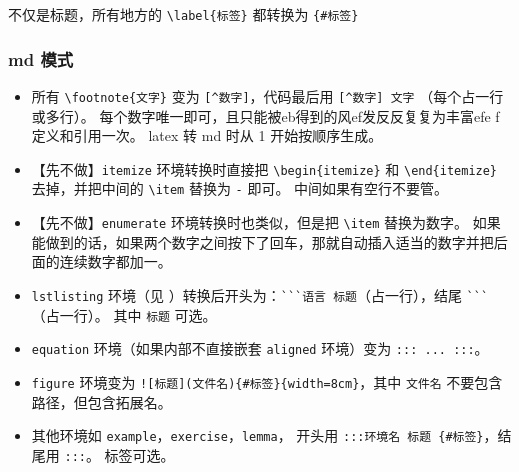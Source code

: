 
不仅是标题，所有地方的 \verb`\label{标签}` 都转换为 \verb`{#标签}`

\subsubsection{md 模式}
\begin{itemize}

\subsubsection{文章信息}

\item 所有 \verb`\footnote{文字}` 变为 \verb`[^数字]`，代码最后用 \verb`[^数字] 文字` （每个占一行或多行）。 每个数字唯一即可，且只能被eb得到的风ef发反反复复为丰富efe f定义和引用一次。 latex 转 md 时从 1 开始按顺序生成。



\item 【先不做】\verb`itemize` 环境转换时直接把 \verb`\begin{itemize}` 和 \verb`\end{itemize}` 去掉，并把中间的 \verb`\item` 替换为 \verb`-` 即可。 中间如果有空行不要管。
\item 【先不做】\verb`enumerate` 环境转换时也类似，但是把 \verb`\item` 替换为数字。 如果能做到的话，如果两个数字之间按下了回车，那就自动插入适当的数字并把后面的连续数字都加一。
\item \verb`lstlisting` 环境（见 ）转换后开头为：\verb|```语言 标题|（占一行），结尾 \verb|```|（占一行）。 其中 \verb`标题` 可选。



\item \verb`equation` 环境（如果内部不直接嵌套 \verb`aligned` 环境）变为 \verb`::: ... :::`。
\item \verb`figure` 环境变为 \verb`![标题](文件名){#标签}{width=8cm}`，其中 \verb`文件名` 不要包含路径，但包含拓展名。
\item 其他环境如 \verb`example`，\verb`exercise`，\verb`lemma`， 开头用 \verb`:::环境名 标题 {#标签}`，结尾用 \verb`:::`。 标签可选。
\end{itemize}


